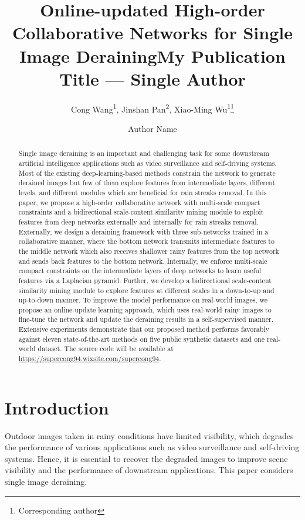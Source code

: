 \documentclass[letterpaper]{article} %
\title{Online-updated High-order Collaborative Networks for Single Image Deraining}
\author {
    Cong Wang\textsuperscript{\rm 1},
    Jinshan Pan\textsuperscript{\rm 2},
    Xiao-Ming Wu\textsuperscript{\rm 1}\thanks{\rm Corresponding author}
}
\title{My Publication Title --- Single Author}
\author {
    Author Name
}
\begin{document}
\maketitle
\begin{abstract}
Single image deraining is an important and challenging task for some downstream artificial intelligence applications such as video surveillance and self-driving systems.
Most of the existing deep-learning-based methods constrain the network to generate derained images but few of them explore features from intermediate layers, different levels, and different modules which are beneficial for rain streaks removal.
In this paper, we propose a high-order collaborative network with multi-scale compact constraints and a bidirectional scale-content similarity mining module to exploit features from deep networks externally and internally for rain streaks removal.
Externally, we design a deraining framework with three sub-networks trained in a collaborative manner, where the bottom network transmits intermediate features to the middle network which also receives shallower rainy features from the top network and sends back features to the bottom network.
Internally, we enforce multi-scale compact constraints on the intermediate layers of deep networks to learn useful features via a Laplacian pyramid.
Further, we develop a bidirectional scale-content similarity mining module to explore features at different scales in a down-to-up and up-to-down manner.
To improve the model performance on real-world images, we propose an online-update learning approach, which uses real-world rainy images to fine-tune the network and update the deraining results in a self-supervised manner.
Extensive experiments demonstrate that our proposed method performs favorably against eleven state-of-the-art methods on five public synthetic datasets and one real-world dataset.
The source code will be available at \url{https://supercong94.wixsite.com/supercong94}.
\end{abstract}

\section{Introduction}
Outdoor images taken in rainy conditions have limited visibility, which degrades the performance of various applications such as video surveillance and self-driving systems.
Hence, it is essential to recover the degraded images to improve scene visibility and the performance of downstream applications. This paper considers single image deraining.
\end{document}
